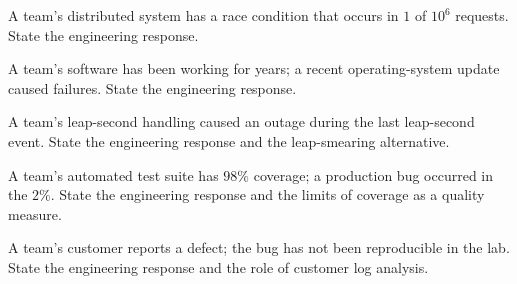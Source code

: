 \begin{exercise}
A team's distributed system has a race condition that occurs in $1$ of $10^6$ requests. State the engineering response.
\end{exercise}

\begin{exercise}
A team's software has been working for years; a recent operating-system update caused failures. State the engineering response.
\end{exercise}

\begin{exercise}
A team's leap-second handling caused an outage during the last leap-second event. State the engineering response and the leap-smearing alternative.
\end{exercise}

\begin{exercise}
A team's automated test suite has $98\%$ coverage; a production bug occurred in the $2\%$. State the engineering response and the limits of coverage as a quality measure.
\end{exercise}

\begin{exercise}
A team's customer reports a defect; the bug has not been reproducible in the lab. State the engineering response and the role of customer log analysis.
\end{exercise}

